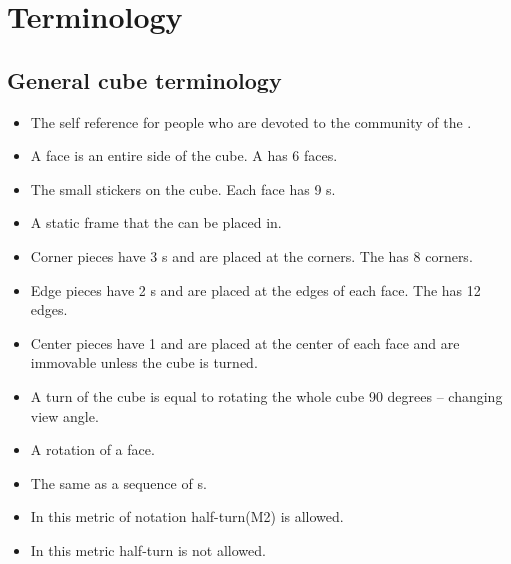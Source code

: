 \chapter{Terminology}
\section{General cube terminology}
\label{sec:generalNotation}
\begin{itemize}
\item {}The self reference for people who are devoted to the community of the \rubik{}. 
\item {}A face is an entire side of the cube. A \rubik{} has 6 faces.
\item {}The small stickers on the cube. Each face has 9 \facet{}s.
\item \myTermHigh{\cubicle{}} A static frame that the \cpiece{} can be placed in.
\item {}Corner pieces have 3 \facet{}s and are placed at the corners. The \rubik{} has 8 corners. 
\item {}Edge pieces have 2 \facet{}s and are placed at the edges of each face. The \rubik{} has 12 edges.
\item {}Center pieces have 1 \facet{} and are placed at the center of each face and are immovable unless the cube is turned. 
\item {}A turn of the cube is equal to rotating the whole cube 90 degrees -- changing view angle.
\item {}A rotation of a face.%
\item {}The same as a sequence of \twist{}s.
\item {}In this metric of notation half-turn(M2) is allowed.
\item {}In this metric half-turn is not allowed.
\end{itemize}

